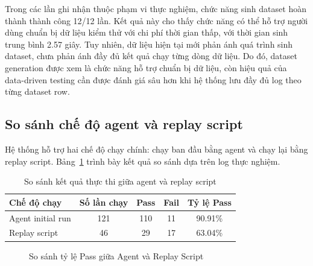 Trong các lần ghi nhận thuộc phạm vi thực nghiệm, chức năng sinh dataset hoàn thành thành công 12/12 lần. Kết quả này cho thấy chức năng có thể hỗ trợ người dùng chuẩn bị dữ liệu kiểm thử với chi phí thời gian thấp, với thời gian sinh trung bình 2.57 giây. Tuy nhiên, dữ liệu hiện tại mới phản ánh quá trình sinh dataset, chưa phản ánh đầy đủ kết quả chạy từng dòng dữ liệu. Do đó, dataset generation được xem là chức năng hỗ trợ chuẩn bị dữ liệu, còn hiệu quả của data-driven testing cần được đánh giá sâu hơn khi hệ thống lưu đầy đủ log theo từng dataset row.

\subsection{So sánh chế độ agent và replay script}

Hệ thống hỗ trợ hai chế độ chạy chính: chạy ban đầu bằng agent và chạy lại bằng replay script. Bảng~\ref{tab:chapter6_agent_replay_result} trình bày kết quả so sánh dựa trên log thực nghiệm.

\begin{table}[H]
\centering
\caption{So sánh kết quả thực thi giữa agent và replay script}
\label{tab:chapter6_agent_replay_result}
\renewcommand{\arraystretch}{1.2}
\begin{tabular}{|p{4.0cm}|c|c|c|c|}
\hline
\textbf{Chế độ chạy} & \textbf{Số lần chạy} & \textbf{Pass} & \textbf{Fail} & \textbf{Tỷ lệ Pass} \\
\hline
Agent initial run & 121 & 110 & 11 & 90.91\% \\
\hline
Replay script & 46 & 29 & 17 & 63.04\% \\
\hline
\end{tabular}
\end{table}

\begin{figure}[H]
\centering
{}
\caption{So sánh tỷ lệ Pass giữa Agent và Replay Script}
\label{fig:chapter6_agent_replay_pass_rate}
\end{figure}


